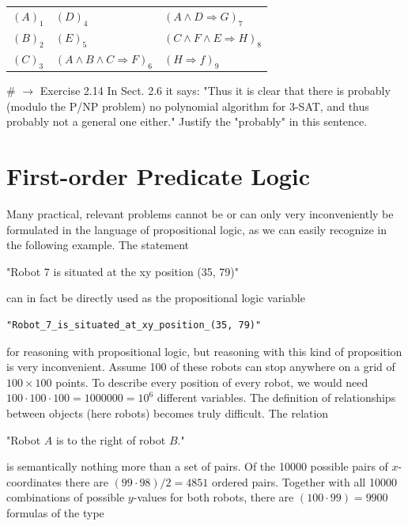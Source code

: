 \documentclass[10pt]{book}
\begin{document}
\begin{center}
\begin{tabular}{lll}
$(A)_{1}$ & $(D)_{4}$ & $(A \wedge D \Rightarrow G)_{7}$ \\
$(B)_{2}$ & $(E)_{5}$ & $(C \wedge F \wedge E \Rightarrow H)_{8}$ \\
$(C)_{3}$ & $(A \wedge B \wedge C \Rightarrow F)_{6}$ & $(H \Rightarrow f)_{9}$ \\
\end{tabular}
\end{center}

\# $\rightarrow$ Exercise 2.14 In Sect. 2.6 it says: "Thus it is clear that there is probably (modulo the P/NP problem) no polynomial algorithm for 3-SAT, and thus probably not a general one either." Justify the "probably" in this sentence.

\chapter{First-order Predicate Logic}

Many practical, relevant problems cannot be or can only very inconveniently be formulated in the language of propositional logic, as we can easily recognize in the following example. The statement


\begin{displayquote}
"Robot 7 is situated at the xy position (35, 79)"
\end{displayquote}

can in fact be directly used as the propositional logic variable

\begin{verbatim}
"Robot_7_is_situated_at_xy_position_(35, 79)"
\end{verbatim}

for reasoning with propositional logic, but reasoning with this kind of proposition is very inconvenient. Assume 100 of these robots can stop anywhere on a grid of $100 \times 100$ points. To describe every position of every robot, we would need $100 \cdot 100 \cdot 100=1000000=10^{6}$ different variables. The definition of relationships between objects (here robots) becomes truly difficult. The relation

\begin{displayquote}
"Robot $A$ is to the right of robot $B$."
\end{displayquote}

is semantically nothing more than a set of pairs. Of the 10000 possible pairs of $x$-coordinates there are $(99 \cdot 98) / 2=4851$ ordered pairs. Together with all 10000 combinations of possible $y$-values for both robots, there are $(100 \cdot 99)=9900$ formulas of the type
\end{document}
